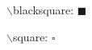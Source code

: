 \documentclass{scrartcl}
\begin{document}
$\backslash$blacksquare: $\blacksquare$

$\backslash$square: $\square$
\end{document}
